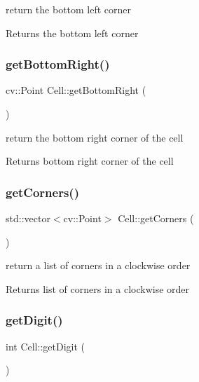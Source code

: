 return the bottom left corner \begin{DoxyReturn}{Returns}
the bottom left corner 
\end{DoxyReturn}
\mbox{\label{class_cell_afa1704102095fd55ac036f7d290eed05}} 
\subsubsection{\texorpdfstring{get\+Bottom\+Right()}{getBottomRight()}}
{\footnotesize\ttfamily cv\+::\+Point Cell\+::get\+Bottom\+Right (\begin{DoxyParamCaption}{ }\end{DoxyParamCaption})}

return the bottom right corner of the cell \begin{DoxyReturn}{Returns}
bottom right corner of the cell 
\end{DoxyReturn}
\mbox{\label{class_cell_a03becce6b307d86848e9563eb08ac2b3}} 
\subsubsection{\texorpdfstring{get\+Corners()}{getCorners()}}
{\footnotesize\ttfamily std\+::vector$<$cv\+::\+Point$>$ Cell\+::get\+Corners (\begin{DoxyParamCaption}{ }\end{DoxyParamCaption})}

return a list of corners in a clockwise order \begin{DoxyReturn}{Returns}
list of corners in a clockwise order 
\end{DoxyReturn}
\mbox{\label{class_cell_a335c410074aaac9bb5594ea8adf648ff}} 
\subsubsection{\texorpdfstring{get\+Digit()}{getDigit()}}
{\footnotesize\ttfamily int Cell\+::get\+Digit (\begin{DoxyParamCaption}{ }\end{DoxyParamCaption})}

